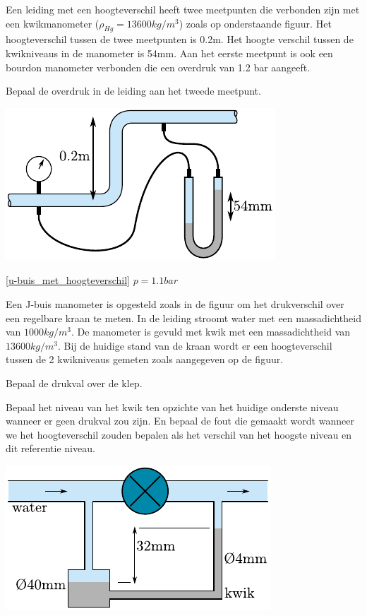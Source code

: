 	\begin{toepassing}[*]
		\label{u-buis_met_hoogteverschil}
Een leiding met een hoogteverschil heeft twee meetpunten die verbonden zijn met een kwikmanometer ($\rho_{Hg}=13600kg/m^3$) zoals op onderstaande figuur. Het hoogteverschil tussen de twee meetpunten is 0.2m. Het hoogte verschil tussen de kwikniveaus in de manometer is 54mm. Aan het eerste meetpunt is ook een bourdon manometer verbonden die een overdruk van 1.2 bar aangeeft.
		
Bepaal de overdruk in de leiding aan het tweede meetpunt.

\centering
\includegraphics{fig/hydrostatica/u-buis_met_hoogteverschil}
	\end{toepassing}
	\begin{antwoord}{\ref{u-buis_met_hoogteverschil}}
		$p = 1.1\unit{bar}$
	\end{antwoord}
	\begin{toepassing}
		\label{J-buis}
Een J-buis manometer is opgesteld zoals in de figuur om het drukverschil over een regelbare kraan te meten. In de leiding stroomt water met een massadichtheid van $1000kg/m^3$. De manometer is gevuld met kwik met een massadichtheid van $13600kg/m^3$. Bij de huidige stand van de kraan wordt er een hoogteverschil tussen de 2 kwikniveaus gemeten zoals aangegeven op de figuur.
		
Bepaal de drukval over de klep.
		
Bepaal het niveau van het kwik ten opzichte van het huidige onderste niveau wanneer er geen drukval zou zijn. En bepaal de fout die gemaakt wordt wanneer we het hoogteverschil zouden bepalen als het verschil van het hoogste niveau en dit referentie niveau.

\centering
\includegraphics{fig/hydrostatica/J-buis}
	\end{toepassing}
